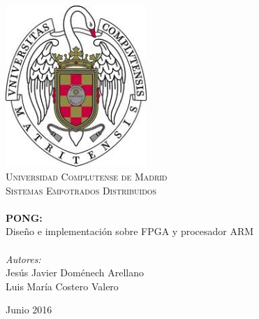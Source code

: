 \begin{titlepage}

  \begin{center}


    \includegraphics[width=0.4\textwidth]{images/escudo.jpg}\\[1cm]    

    \textsc{\LARGE Universidad Complutense de Madrid}\\[1.5cm]

    \textsc{\Large Sistemas Empotrados Distribuidos}\\[0.5cm]


    \HRule \\[0.4cm]
           { \huge {\bfseries PONG:}\vspace{0.3cm}\\
             Diseño e implementación sobre FPGA y procesador ARM }\\[0.4cm]
           
           \HRule \\[1.5cm]

           \vspace{1.5cm}
           \hfill\emph{Autores:}\\
           \hfill Jesús Javier Doménech Arellano\\
           \hfill Luis María Costero Valero
           
           \vfill
           
           {\large Junio 2016}
           
  \end{center}
  
\end{titlepage}


%
%
